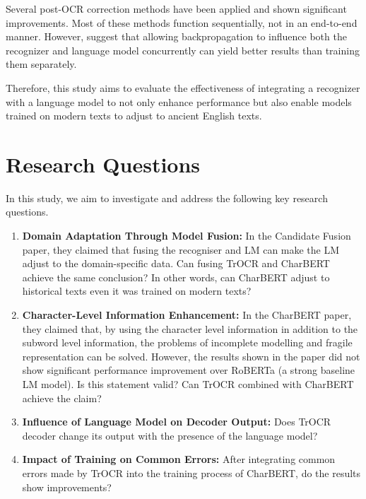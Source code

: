Several post-OCR correction methods have been applied and shown significant improvements. Most of these methods function sequentially, not in an end-to-end manner. However, \cite{kang2021candidate} suggest that allowing backpropagation to influence both the recognizer and language model concurrently can yield better results than training them separately. 

Therefore, this study aims to evaluate the effectiveness of integrating a recognizer with a language model to not only enhance performance but also enable models trained on modern texts to adjust to ancient English texts.
\section{Research Questions}
\label{sec:1_research_questions}
In this study, we aim to investigate and address the following key research questions. 
\begin{enumerate}
    \item \textbf{Domain Adaptation Through Model Fusion: }In the Candidate Fusion paper, they claimed that fusing the recogniser and LM can make the LM adjust to the domain-specific data. Can fusing TrOCR and CharBERT achieve the same conclusion? In other words, can CharBERT adjust to historical texts even it was trained on modern texts?
    \item \textbf{Character-Level Information Enhancement: }In the CharBERT paper, they claimed that, by using the character level information in addition to the subword level information, the problems of incomplete modelling and fragile 
    representation can be solved. However, the results shown in the paper did not show significant performance improvement over RoBERTa (a strong baseline LM model). Is this statement valid? Can TrOCR combined with CharBERT achieve the claim?
    \item \textbf{Influence of Language Model on Decoder Output: }Does TrOCR decoder change its output with the presence of the language model?
    \item \textbf{Impact of Training on Common Errors:} After integrating common errors made by TrOCR into the training process of CharBERT, do the results show improvements? 
\end{enumerate}

